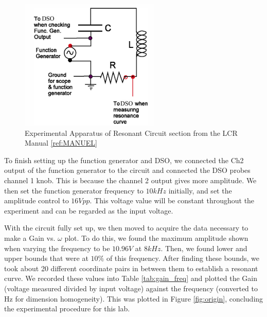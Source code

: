 \documentclass[12pt]{article}
\begin{document}
\begin{figure}
    \centering
    \includegraphics[width=\linewidth]{figures/images/LCR_Apparatus_2.png}
    \caption{Experimental Apparatus of Resonant Circuit section from the LCR Manual \ref{ref:MANUEL}}
    \label{fig:LCR_Apparatus_2}
\end{figure}

To finish setting up the function generator and DSO, we connected the Ch2 output of the function generator to the circuit and connected the DSO probes channel 1 knob. This is because the channel 2 output gives more amplitude. We then set the function generator frequency to $10 kHz$ initially, and set the amplitude control to $16Vpp$. This voltage value will be constant throughout the experiment and can be regarded as the input voltage.

With the circuit fully set up, we then moved to acquire the data necessary to make a Gain vs. $\omega$ plot. To do this, we found the maximum amplitude shown when varying the frequency to be $10.96V$ at $8 kHz$. Then, we found lower and upper bounds that were at $10\%$ of this frequency. After finding these bounds, we took about 20 different coordinate pairs in between them to establish a resonant curve. We recorded these values into Table \ref{tab:gain_freq} and plotted the Gain (voltage measured divided by input voltage) against the frequency (converted to Hz for dimension homogeneity). This was plotted in Figure \ref{fig:origin}, concluding the experimental procedure for this lab.
\end{document}
